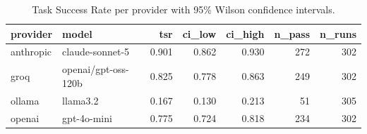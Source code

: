 \begin{table}
\caption{Task Success Rate per provider with 95\% Wilson confidence intervals.}
\label{tab:table2_tsr_by_provider}
\begin{tabular}{llrrrrr}
\toprule
provider & model & tsr & ci_low & ci_high & n_pass & n_runs \\
\midrule
anthropic & claude-sonnet-5 & 0.901 & 0.862 & 0.930 & 272 & 302 \\
groq & openai/gpt-oss-120b & 0.825 & 0.778 & 0.863 & 249 & 302 \\
ollama & llama3.2 & 0.167 & 0.130 & 0.213 & 51 & 305 \\
openai & gpt-4o-mini & 0.775 & 0.724 & 0.818 & 234 & 302 \\
\bottomrule
\end{tabular}
\end{table}
